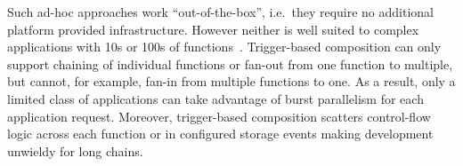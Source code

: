 %







Such ad-hoc approaches work ``out-of-the-box'', i.e.\ they require no additional
platform provided infrastructure. However neither is well suited to complex
applications with 10s or 100s of functions~\cite{excamera, hello-retail}.
Trigger-based composition can only support chaining of individual functions or
fan-out from one function to multiple, but cannot, for example, fan-in from
multiple functions to one. As a result, only a limited class of applications can
take advantage of burst parallelism for each application request. Moreover,
trigger-based composition scatters control-flow logic across each function or in
configured storage events making development unwieldy for long chains.

